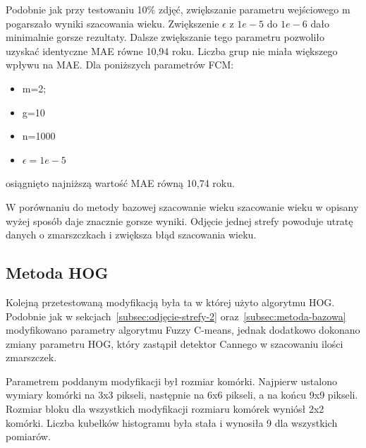 \documentclass[a4paper,twoside,12pt]{book}
\begin{document}
    Podobnie jak przy testowaniu 10\% zdjęć, zwiększanie parametru wejściowego m pogarszało wyniki szacowania wieku.
    Zwiększenie $\epsilon$ z $1e-5$ do $1e-6$ dało minimalnie gorsze rezultaty. Dalsze zwiększanie tego parametru
    pozwoliło uzyskać identyczne MAE równe 10,94 roku.
    Liczba grup nie miała większego wpływu na MAE.
    Dla poniższych parametrów FCM:
    \begin{itemize}
        \item m=2;
        \item g=10
        \item n=1000
        \item $\epsilon=1e-5$
    \end{itemize}
    osiągnięto najniższą wartość MAE równą 10,74 roku.

    W porównaniu do metody bazowej szacowanie wieku szacowanie wieku w opisany wyżej sposób daje znacznie
    gorsze wyniki. Odjęcie jednej strefy powoduje utratę
    danych o zmarszczkach i zwiększa błąd szacowania wieku.

    \subsection{Metoda HOG}\label{subsec:metoda-hog}
    Kolejną przetestowaną modyfikacją była ta w której użyto algorytmu HOG.
    Podobnie jak w sekcjach~\ref{subsec:odjęcie-strefy-2} oraz~\ref{subsec:metoda-bazowa} modyfikowano parametry
    algorytmu Fuzzy C-means, jednak dodatkowo dokonano zmiany parametru HOG, który zastąpił detektor Cannego w
    szacowaniu ilości zmarszczek.

    Parametrem poddanym modyfikacji był
    rozmiar komórki. Najpierw ustalono wymiary komórki na 3x3 pikseli, następnie na 6x6 pikseli, a na końcu 9x9
    pikseli.
    Rozmiar bloku dla wszystkich modyfikacji rozmiaru komórek wyniósł
    2x2 komórki. Liczba kubełków histogramu była stała i wynosiła 9 dla wszystkich pomiarów.
\end{document}
